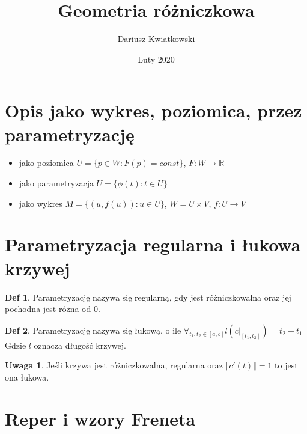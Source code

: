 \documentclass{article}
\title{Geometria różniczkowa}
\author{Dariusz Kwiatkowski}
\date{Luty 2020}
\theoremstyle{plain}
\theoremstyle{definition}
\newtheorem*{defi*}{Def}
\theoremstyle{definition}
\newtheorem*{not*}{Uwaga}
\begin{document}
\maketitle

\tableofcontents

\section{Opis jako wykres, poziomica, przez parametryzację}

\begin{itemize}
    \item jako poziomica $U = \{ p \in W : F(p) = const \}$, $F: W \to \mathbb{R}$
    \item jako parametryzacja $U = \{ \phi(t) : t \in U \}$
    \item jako wykres $M = \{ (u, f(u)) : u \in U \}$, $W = U \times V$, $f: U \to V$
\end{itemize}

\section{Parametryzacja regularna i łukowa krzywej}

\begin{defi*} 
    Parametryzację nazywa się regularną, gdy jest różniczkowalna oraz jej pochodna jest różna od 0. 
\end{defi*}

\begin{defi*}
    Parametryzację nazywa się łukową, o ile $\forall_{t_1, t_2 \in [a,b]} l(c|_{[t_1,t_2]}) = t_2 - t_1$ \\
    Gdzie $l$ oznacza długość krzywej.
    
    \begin{not*} 
    Jeśli krzywa jest różniczkowalna, regularna oraz $\Vert c'(t) \Vert = 1$ to jest ona łukowa.
    
    \end{not*}
\end{defi*}

\section{Reper i wzory Freneta}
\end{document}
